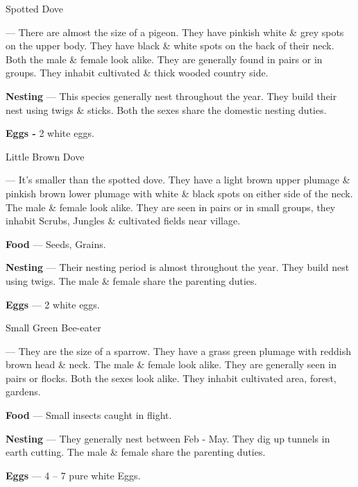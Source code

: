 \begin{bird}{Spotted Dove}

 --- There are almost the size of a pigeon. They have pinkish white \& grey spots on the upper body. They have black \& white spots on the back of their neck. Both the male \& female look alike. They are generally found in pairs or in groups. They inhabit cultivated \& thick wooded country side. 

{\large\bf Nesting} --- This species generally nest throughout the year. They build their nest using twigs \& sticks. Both the sexes share the domestic nesting duties.

{\large\bf Eggs -} 2 white eggs.
\end{bird}

\newpage

\begin{bird}{Little Brown Dove}

 --- It's smaller than the spotted dove. They have a light brown upper plumage \& pinkish brown lower plumage with white \& black spots on either side of the neck. The male \& female look alike. They are seen in pairs or in small groups, they inhabit Scrubs, Jungles \& cultivated fields near village. 

{\large\bf Food} --- Seeds, Grains.

{\large\bf Nesting} --- Their nesting period is almost throughout the year. They build nest using twigs. The male \& female share the parenting duties.

{\large\bf Eggs} --- 2 white eggs.
\end{bird}

\begin{bird}{Small Green Bee-eater}

 --- They are the size of a sparrow. They have a grass green plumage with reddish brown head \& neck. The male \& female look alike. They are generally seen in pairs or flocks. Both the sexes look alike. They inhabit cultivated area, forest, gardens.

{\large\bf Food} --- Small insects caught in flight.

{\large\bf Nesting} --- They generally nest between Feb - May. They dig up tunnels in earth cutting. The male \& female share the parenting duties.

{\large\bf Eggs} --- 4 -- 7 pure white Eggs.
\end{bird}

